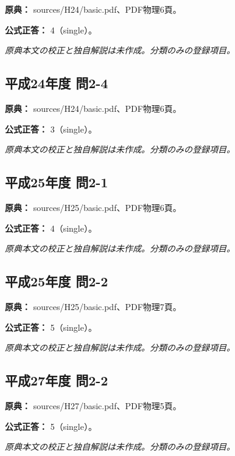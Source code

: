 \noindent\textbf{原典：} sources/H24/basic.pdf、PDF物理6頁。

\textbf{公式正答：} 4（single）。

\par\textit{原典本文の校正と独自解説は未作成。分類のみの登録項目。}

\subsection{平成24年度 問2-4}
\label{q:h24-reg-basic-2-4}

\noindent\textbf{原典：} sources/H24/basic.pdf、PDF物理6頁。

\textbf{公式正答：} 3（single）。

\par\textit{原典本文の校正と独自解説は未作成。分類のみの登録項目。}

\subsection{平成25年度 問2-1}
\label{q:h25-reg-basic-2-1}

\noindent\textbf{原典：} sources/H25/basic.pdf、PDF物理6頁。

\textbf{公式正答：} 4（single）。

\par\textit{原典本文の校正と独自解説は未作成。分類のみの登録項目。}

\subsection{平成25年度 問2-2}
\label{q:h25-reg-basic-2-2}

\noindent\textbf{原典：} sources/H25/basic.pdf、PDF物理7頁。

\textbf{公式正答：} 5（single）。

\par\textit{原典本文の校正と独自解説は未作成。分類のみの登録項目。}

\subsection{平成27年度 問2-2}
\label{q:h27-reg-basic-2-2}

\noindent\textbf{原典：} sources/H27/basic.pdf、PDF物理5頁。

\textbf{公式正答：} 5（single）。

\par\textit{原典本文の校正と独自解説は未作成。分類のみの登録項目。}

